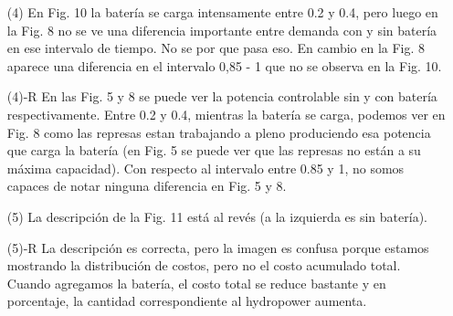 \documentclass[12pt]{article}
\theoremstyle{definition}
\theoremstyle{remark}
\begin{document}
\begin{enumerate}
\item[(4)] En Fig. 10 la bater\'ia se carga intensamente entre 0.2 y 0.4, pero luego en la Fig. 8 no se ve una diferencia importante entre demanda con y sin bater\'ia en ese intervalo de tiempo. No se por que pasa eso. En cambio en la Fig. 8 aparece una diferencia en el intervalo 0,85 - 1 que no se observa en la Fig. 10.

\item[(4)-R] En las Fig. 5 y 8 se puede ver la potencia controlable sin y con bater\'ia respectivamente. Entre 0.2 y 0.4, mientras la bater\'ia se carga, podemos ver en Fig. 8 como las represas estan trabajando a pleno produciendo esa potencia que carga la bater\'ia (en Fig. 5 se puede ver que las represas no est\'an a su m\'axima capacidad). Con respecto al intervalo entre 0.85 y 1, no somos capaces de notar ninguna diferencia en Fig. 5 y 8.

\item[(5)] La descripci\'on de la Fig. 11 est\'a al rev\'es (a la izquierda es sin bater\'ia).

\item[(5)-R] La descripci\'on es correcta, pero la imagen es confusa porque estamos mostrando la distribuci\'on de costos, pero no el costo acumulado total. Cuando agregamos la bater\'ia, el costo total se reduce bastante y en porcentaje, la cantidad correspondiente al hydropower aumenta.

\end{enumerate}
\end{document}
